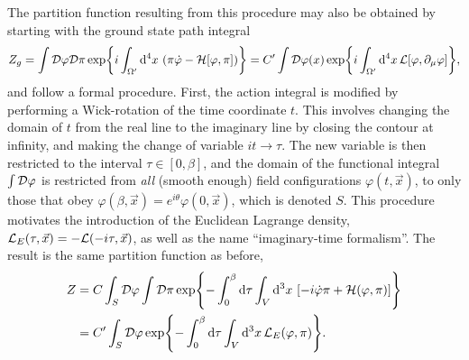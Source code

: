 The partition function resulting from this procedure may also be obtained by starting with the ground state path integral
\begin{equation*}
    Z_g
    =\int \mathcal{D}\varphi\mathcal{D}\pi
    \exp{i \int_{\Omega'} \dd^4 x \, \left(\pi\dot\varphi - \mathcal{H}[\varphi, \pi]\right)}
    = C' \int \mathcal{D} \varphi(x)
    \exp{i \int_{\Omega'} \dd^4 x \, \mathcal{L}[\varphi, \partial_\mu \varphi]},
\end{equation*}
and follow a formal procedure.
First, the action integral is modified by performing a Wick-rotation of the time coordinate $t$.
This involves changing the domain of $t$ from the real line to the imaginary line by closing the contour at infinity, and making the change of variable $it \rightarrow \tau$.
The new variable is then restricted to the interval $\tau\in [0, \beta]$, and the domain of the functional integral $\int \mathcal{D} \varphi$ is restricted from \emph{all} (smooth enough) field configurations $\varphi(t, \vec x)$, to only those that obey $\varphi(\beta, \vec x) = e^{i\theta} \varphi(0, \vec x) $, which is denoted $S$.
This procedure motivates the introduction of  the Euclidean Lagrange density, 
$\mathcal{L}_E(\tau, \vec x) = -\mathcal{L}(-i \tau, \vec x)$, as well as the name ``imaginary-time formalism''.
The result is the same partition function as before,
\begin{align}
    Z & = C \int_S \mathcal{D} \varphi \int \mathcal{D} \pi
    \exp{
        - \int_0^\beta \dd \tau \int_V \dd^3x \, 
        \left[
            - i\dot \varphi \pi
            + \mathcal{H}(\varphi, \pi)
        \right]
    } \nonumber \\ \label{free scalar result 2}
    & =
    C' \int_S \mathcal{D} \varphi
    \exp{- \int_0^\beta \dd \tau \int_V \dd^3x \, \mathcal{L}_E(\varphi, \pi)}.
\end{align}
